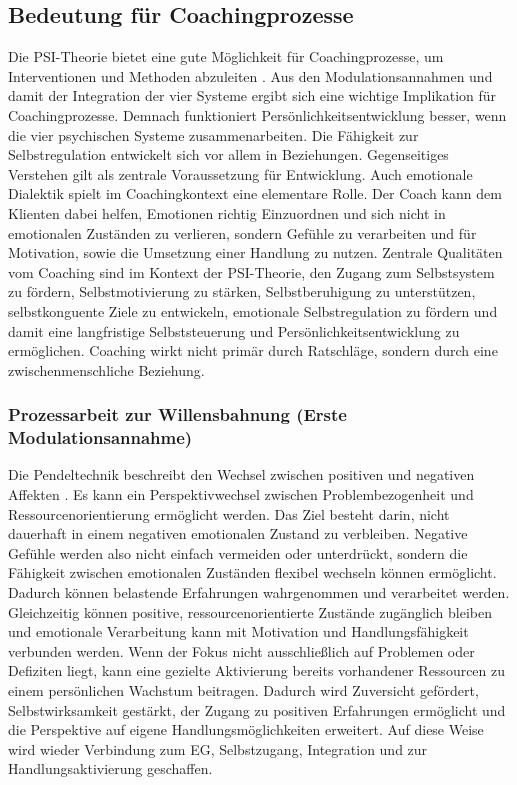 \subsection{Bedeutung für Coachingprozesse} \label{prozess}
Die PSI-Theorie bietet eine gute Möglichkeit für Coachingprozesse, um Interventionen und Methoden abzuleiten \citep{kuhl2005neue}. Aus den Modulationsannahmen und damit der Integration der vier Systeme ergibt sich eine wichtige Implikation für Coachingprozesse. Demnach funktioniert Persönlichkeitsentwicklung besser, wenn die vier psychischen Systeme zusammenarbeiten. Die Fähigkeit zur Selbstregulation entwickelt sich vor allem in Beziehungen. Gegenseitiges Verstehen gilt als zentrale Voraussetzung für Entwicklung. Auch emotionale Dialektik spielt im Coachingkontext eine elementare Rolle. Der Coach kann dem Klienten dabei helfen, Emotionen richtig Einzuordnen und sich nicht in emotionalen Zuständen zu verlieren, sondern Gefühle zu verarbeiten und für Motivation, sowie die Umsetzung einer Handlung zu nutzen. Zentrale Qualitäten vom Coaching sind im Kontext der PSI-Theorie, den Zugang zum Selbstsystem zu fördern, Selbstmotivierung zu stärken, Selbstberuhigung zu unterstützen, selbstkonguente Ziele zu entwickeln, emotionale Selbstregulation zu fördern und damit eine langfristige Selbststeuerung und Persönlichkeitsentwicklung zu ermöglichen. Coaching wirkt nicht primär durch Ratschläge, sondern durch eine zwischenmenschliche Beziehung.

\subsubsection{Prozessarbeit zur Willensbahnung (Erste Modulationsannahme)}
Die Pendeltechnik beschreibt den Wechsel zwischen positiven und negativen Affekten \citep{kuhl2005neue}. Es kann ein Perspektivwechsel zwischen Problembezogenheit und Ressourcenorientierung ermöglicht werden. Das Ziel besteht darin, nicht dauerhaft in einem negativen emotionalen Zustand zu verbleiben. Negative Gefühle werden also nicht einfach vermeiden oder unterdrückt, sondern die Fähigkeit zwischen emotionalen Zuständen flexibel wechseln können ermöglicht. Dadurch können belastende Erfahrungen wahrgenommen und verarbeitet werden. Gleichzeitig können positive, ressourcenorientierte Zustände zugänglich bleiben und emotionale Verarbeitung kann mit Motivation und Handlungsfähigkeit verbunden werden. Wenn der Fokus nicht ausschließlich auf Problemen oder Defiziten liegt, kann eine gezielte Aktivierung bereits vorhandener Ressourcen zu einem persönlichen Wachstum beitragen. Dadurch wird Zuversicht gefördert, Selbstwirksamkeit gestärkt, der Zugang zu positiven Erfahrungen ermöglicht und die Perspektive auf eigene Handlungsmöglichkeiten erweitert. Auf diese Weise wird wieder Verbindung zum EG, Selbstzugang, Integration und zur Handlungsaktivierung geschaffen. 

